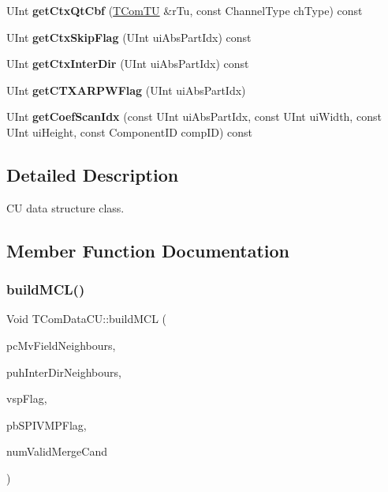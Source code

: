 \begin{DoxyCompactItemize}
U\+Int {\bfseries get\+Ctx\+Qt\+Cbf} (\hyperlink{class_t_com_t_u}{T\+Com\+TU} \&r\+Tu, const Channel\+Type ch\+Type) const
\item 
\mbox{\label{class_t_com_data_c_u_ad5ccc6660cec4c00592ba2baf67c03eb}} 
U\+Int {\bfseries get\+Ctx\+Skip\+Flag} (U\+Int ui\+Abs\+Part\+Idx) const
\item 
\mbox{\label{class_t_com_data_c_u_abf22a4b8442d38fca00c934473cd3f80}} 
U\+Int {\bfseries get\+Ctx\+Inter\+Dir} (U\+Int ui\+Abs\+Part\+Idx) const
\item 
\mbox{\label{class_t_com_data_c_u_a12c3beb6b1ce1301290ffe4dfd0071d5}} 
U\+Int {\bfseries get\+C\+T\+X\+A\+R\+P\+W\+Flag} (U\+Int ui\+Abs\+Part\+Idx)
\item 
\mbox{\label{class_t_com_data_c_u_a36d2f75a7aa83b5e267e218a00491074}} 
U\+Int {\bfseries get\+Coef\+Scan\+Idx} (const U\+Int ui\+Abs\+Part\+Idx, const U\+Int ui\+Width, const U\+Int ui\+Height, const Component\+ID comp\+ID) const
\end{DoxyCompactItemize}


\subsection{Detailed Description}
CU data structure class. 

\subsection{Member Function Documentation}
\mbox{\label{class_t_com_data_c_u_aa6997f12cfa3d044ba4e0dc4085dca1d}} 
\subsubsection{\texorpdfstring{build\+M\+C\+L()}{buildMCL()}}
{\footnotesize\ttfamily Void T\+Com\+Data\+C\+U\+::build\+M\+CL (\begin{DoxyParamCaption}\item[{\hyperlink{class_t_com_mv_field}{T\+Com\+Mv\+Field} $\ast$}]{pc\+Mv\+Field\+Neighbours,  }\item[{U\+Char $\ast$}]{puh\+Inter\+Dir\+Neighbours,  }\item[{Int $\ast$}]{vsp\+Flag,  }\item[{Bool $\ast$}]{pb\+S\+P\+I\+V\+M\+P\+Flag,  }\item[{Int \&}]{num\+Valid\+Merge\+Cand }\end{DoxyParamCaption})}

